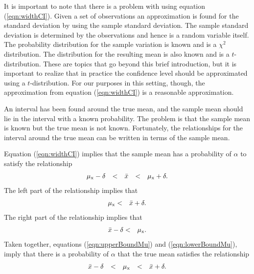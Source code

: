 \documentclass[12pt]{article}
\begin{document}
It is important to note that there is a problem with using equation
(\ref{eqn:widthCI}). Given a set of observations an approximation is
found for the standard deviation by using the sample standard
deviation. The sample standard deviation is determined by the
observations and hence is a random variable itself. The probability
distribution for the sample variation is known and is a $\chi^2$
distribution.  The distribution for the resulting mean is also known
and is a $t$-distribution.  These are topics that go beyond this brief
introduction, but it is important to realize that in practice the
confidence level should be approximated using a $t$-distribution. For
our purposes in this setting, though, the approximation from equation
(\ref{eqn:widthCI}) is a reasonable approximation.

An interval has been found around the true mean, and the sample mean
should lie in the interval with a known probability. The problem is
that the sample mean is known but the true mean is not known.
Fortunately, the relationships for the interval around the true mean
can be written in terms of the sample mean.

Equation (\ref{eqn:widthCI}) implies that the sample mean has a
probability of $\alpha$ to satisfy the relationship
\begin{eqnarray*}
  \begin{array}{rclcl}
    \mu_{\rm x} - \delta & < & \bar{x} & < & \mu_{\rm x} + \delta.
  \end{array}
\end{eqnarray*}
The left part of the relationship implies that
\begin{eqnarray}
  \label{eqn:upperBoundMu}
  \mu_{\rm x} & < & \bar{x} + \delta.
\end{eqnarray}
The right part of the relationship implies that
\begin{eqnarray}
  \label{eqn:lowerBoundMu}
   \bar{x} - \delta & < &  \mu_{\rm x}.
\end{eqnarray}
Taken together, equations (\ref{eqn:upperBoundMu}) and
(\ref{eqn:lowerBoundMu}), imply that there is a probability of
$\alpha$ that the true mean satisfies the relationship
\begin{eqnarray}
  \begin{array}{rclcl}
    \bar{x} - \delta & < & \mu_{\rm x} & < & \bar{x} + \delta.
   \end{array}
\end{eqnarray}
\end{document}
